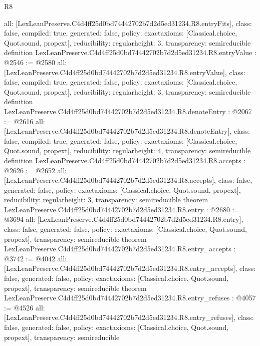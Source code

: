 \begin{lexlean}{R8}
\begin{coremodule}
{  all: [LexLeanPreserve.C4d4ff25d0bd74442702b7d2d5ed31234.R8.entryFits],
  class: false,
  compiled: true,
  generated: false,
  policy: exact{axioms: [Classical.choice, Quot.sound, propext]},
  reducibility: regular{height: 3},
  transparency: semireducible
}
definition LexLeanPreserve.C4d4ff25d0bd74442702b7d2d5ed31234.R8.entryValue : @2546 := @2580 {
  all: [LexLeanPreserve.C4d4ff25d0bd74442702b7d2d5ed31234.R8.entryValue],
  class: false,
  compiled: true,
  generated: false,
  policy: exact{axioms: [Classical.choice, Quot.sound, propext]},
  reducibility: regular{height: 3},
  transparency: semireducible
}
definition LexLeanPreserve.C4d4ff25d0bd74442702b7d2d5ed31234.R8.denoteEntry : @2067 := @2616 {
  all: [LexLeanPreserve.C4d4ff25d0bd74442702b7d2d5ed31234.R8.denoteEntry],
  class: false,
  compiled: true,
  generated: false,
  policy: exact{axioms: [Classical.choice, Quot.sound, propext]},
  reducibility: regular{height: 4},
  transparency: semireducible
}
definition LexLeanPreserve.C4d4ff25d0bd74442702b7d2d5ed31234.R8.accepts : @2626 := @2652 {
  all: [LexLeanPreserve.C4d4ff25d0bd74442702b7d2d5ed31234.R8.accepts],
  class: false,
  generated: false,
  policy: exact{axioms: [Classical.choice, Quot.sound, propext]},
  reducibility: regular{height: 3},
  transparency: semireducible
}
theorem LexLeanPreserve.C4d4ff25d0bd74442702b7d2d5ed31234.R8.entry : @2680 := @3694 {
  all: [LexLeanPreserve.C4d4ff25d0bd74442702b7d2d5ed31234.R8.entry],
  class: false,
  generated: false,
  policy: exact{axioms: [Classical.choice, Quot.sound, propext]},
  transparency: semireducible
}
theorem LexLeanPreserve.C4d4ff25d0bd74442702b7d2d5ed31234.R8.entry_accepts : @3742 := @4042 {
  all: [LexLeanPreserve.C4d4ff25d0bd74442702b7d2d5ed31234.R8.entry_accepts],
  class: false,
  generated: false,
  policy: exact{axioms: [Classical.choice, Quot.sound, propext]},
  transparency: semireducible
}
theorem LexLeanPreserve.C4d4ff25d0bd74442702b7d2d5ed31234.R8.entry_refuses : @4057 := @4526 {
  all: [LexLeanPreserve.C4d4ff25d0bd74442702b7d2d5ed31234.R8.entry_refuses],
  class: false,
  generated: false,
  policy: exact{axioms: [Classical.choice, Quot.sound, propext]},
  transparency: semireducible
}


\end{coremodule}
\end{lexlean}
